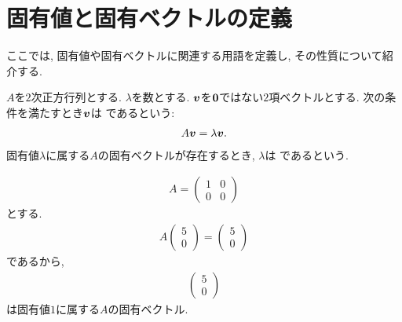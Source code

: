 \section{固有値と固有ベクトルの定義}
ここでは, 固有値や固有ベクトルに関連する用語を定義し,
その性質について紹介する.
\begin{definition}
  \label{def:eigen}
  $A$を$2$次正方行列とする.
  $\lambda$を数とする.
  $\boldsymbol{v}$を$\boldsymbol{0}$ではない$2$項ベクトルとする.
  次の条件を満たすとき$\boldsymbol{v}$は
  であるという:
  \begin{align*}
    A\boldsymbol{v}=\lambda\boldsymbol{v}.
  \end{align*}
  固有値$\lambda$に属する$A$の固有ベクトルが存在するとき,
  $\lambda$は
  であるという.
\end{definition}



\begin{example}
  \begin{align*}
    A=\begin{pmatrix}1&0\\0&0\end{pmatrix}
  \end{align*}
  とする.
  \begin{align*}
    A\begin{pmatrix}5\\0\end{pmatrix}=\begin{pmatrix}5\\0\end{pmatrix}
  \end{align*}
  であるから,
  \begin{align*}
    \begin{pmatrix}5\\0\end{pmatrix}
  \end{align*}
  は固有値$1$に属する$A$の固有ベクトル.
\end{example}

